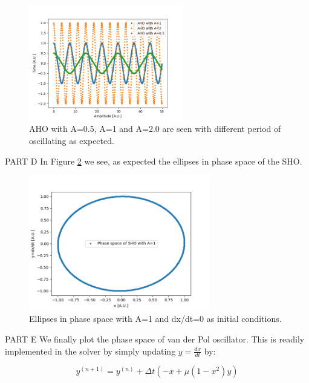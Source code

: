 \documentclass[11pt]{article}
\begin{document}
\begin{figure}[!htbp]
    \centering
    \includegraphics[width=0.6\textwidth]{AHO.png}
    \caption{AHO with A=0.5, A=1 and A=2.0 are seen with different period of oscillating as expected.}
    \label{AHO}
\end{figure}

PART D
In Figure \ref{phase} we see, as expected the ellipses in phase space of the SHO. 
\begin{figure}[!htbp]
    \centering
    \includegraphics[width=0.7\textwidth]{phase.png}
    \caption{Ellipses in phase space with A=1 and dx/dt=0 as initial conditions.}
    \label{phase}
\end{figure}

PART E
We finally plot the phase space of van der Pol oscillator. This is readily implemented in the solver by simply updating $y=\frac{dx}{dt}$ by:

\begin{equation}
    y^{(n+1)}=y^{(n)}+\Delta t(-x+\mu(1-x^2)y)
\end{equation}
\end{document}
